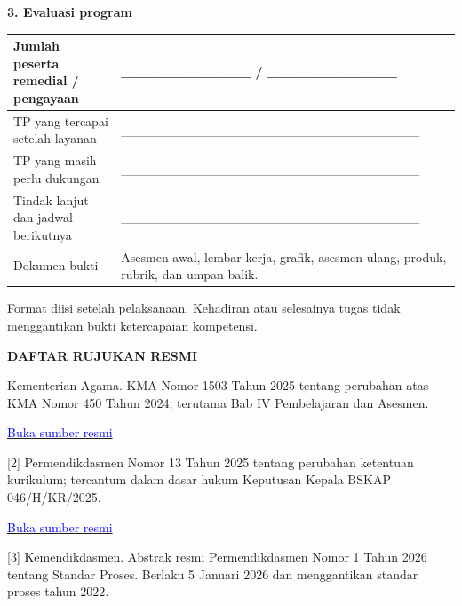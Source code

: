 \documentclass[11pt,a4paper]{article}
\begin{document}
\par\medskip\noindent\textbf{3. Evaluasi program}\par\smallskip
{\small\setlength{\tabcolsep}{2mm}\renewcommand{\arraystretch}{1.35}\begin{longtable}{|>{\raggedright\arraybackslash}p{77.826mm}|>{\raggedright\arraybackslash}p{91.724mm}|}\hline
Jumlah peserta remedial / pengayaan & \_\_\_\_\_\_\_\_\_\_\_\_ / \_\_\_\_\_\_\_\_\_\_\_\_\\ \hline
TP yang tercapai setelah layanan & \_\_\_\_\_\_\_\_\_\_\_\_\_\_\_\_\_\_\_\_\_\_\_\_\_\_\_\_\_\_\_\_\\ \hline
TP yang masih perlu dukungan & \_\_\_\_\_\_\_\_\_\_\_\_\_\_\_\_\_\_\_\_\_\_\_\_\_\_\_\_\_\_\_\_\\ \hline
Tindak lanjut dan jadwal berikutnya & \_\_\_\_\_\_\_\_\_\_\_\_\_\_\_\_\_\_\_\_\_\_\_\_\_\_\_\_\_\_\_\_\\ \hline
Dokumen bukti & Asesmen awal, lembar kerja, grafik, asesmen ulang, produk, rubrik, dan umpan balik.\\ \hline
\end{longtable}}\medskip
{\small Format diisi setelah pelaksanaan. Kehadiran atau selesainya tugas tidak menggantikan bukti ketercapaian kompetensi.\par}\medskip
\clearpage
\begin{center}\bfseries\large DAFTAR RUJUKAN RESMI\end{center}\medskip
[1] Kementerian Agama. KMA Nomor 1503 Tahun 2025 tentang perubahan atas KMA Nomor 450 Tahun 2024; terutama Bab IV Pembelajaran dan Asesmen.\par\medskip
\href{https://sulteng.kemenag.go.id/files/show/20251020162801surat-penyampaian-kma-kurikulum-2025%2Blampiran_compressed-tzR.pdf}{\small\textcolor{blue}{Buka sumber resmi}}\par
\vspace{8.50393701pt}
[2] Permendikdasmen Nomor 13 Tahun 2025 tentang perubahan ketentuan kurikulum; tercantum dalam dasar hukum Keputusan Kepala BSKAP 046/H/KR/2025.\par\medskip
\href{https://bpmpbabel.kemendikdasmen.go.id/PPID/wp-content/uploads/2025/07/KepKaBSKAP-046_2025-ttg-CP.pdf}{\small\textcolor{blue}{Buka sumber resmi}}\par
\vspace{8.50393701pt}
[3] Kemendikdasmen. Abstrak resmi Permendikdasmen Nomor 1 Tahun 2026 tentang Standar Proses. Berlaku 5 Januari 2026 dan menggantikan standar proses tahun 2022.\par\medskip
\end{document}
